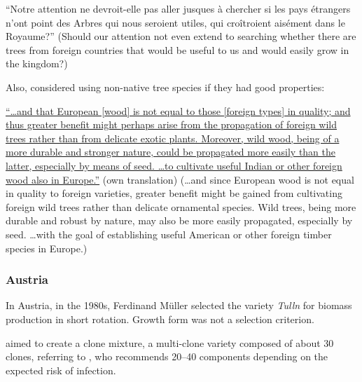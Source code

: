 \enquote{Notre attention ne devroit-elle pas aller jusques à chercher si les pays étrangers n'ont point des Arbres qui nous seroient utiles, qui croîtroient aisément dans le Royaume?} (Should our attention not even extend to searching whether there are trees from foreign countries that would be useful to us and would easily grow in the kingdom?)

Also, \citet[p.~253]{carlowitz1713sylvicultura} considered using non-native tree species if they had good properties:

\hyperlink{german:carlowitz1713sylvicultura}{\enquote{\dots and that European [wood] is not equal to those [foreign types] in quality; and thus greater benefit might perhaps arise from the propagation of foreign wild trees rather than from delicate exotic plants. Moreover, wild wood, being of a more durable and stronger nature, could be propagated more easily than the latter, especially by means of seed. \dots to cultivate useful Indian or other foreign wood also in Europe.}} (own translation) (\dots and since European wood is not equal in quality to foreign varieties, greater benefit might be gained from cultivating foreign wild trees rather than delicate ornamental species. Wild trees, being more durable and robust by nature, may also be more easily propagated, especially by seed. \dots with the goal of establishing useful American or other foreign timber species in Europe.)

\subsubsection{Austria}

In Austria, in the 1980s, Ferdinand Müller selected the variety \emph{Tulln}
for biomass production in short rotation. Growth form was not a selection criterion.

\citet{mueller1999robinie} aimed to create a clone mixture, a multi-clone variety
composed of about 30 clones, referring to \citet{huehn1986klonanazahl}, who recommends
20--40 components depending on the expected risk of infection.

